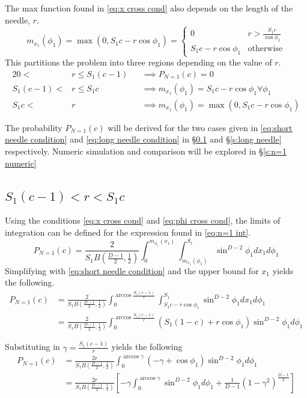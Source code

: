 \documentclass{article}
\begin{document}
The max function found in \ref{eq:x cross cond} also depends on the length of the needle, $r$. 
\begin{equation}
	m_{x_1}(\phi_1) = \max(0, S_1c-r\cos\phi_1) = \begin{cases}
		0 & r > \frac{S_1c}{\cos\phi_1} \\
		S_1c-r\cos\phi_1 & \text{otherwise}
	\end{cases}
\end{equation}
This partitions the problem into three regions depending on the value of $r$. 
\begin{alignat}{2}
	0 < &r \le S_1(c-1) &&\implies P_{N=1}(c) = 0 \\
	S_1(c-1) < &r \le S_1c &&\implies m_{x_1}(\phi_1) = S_1c-r\cos\phi_1 \forall \phi_1 \label{eq:short needle condition}\\
	S_1c < &r &&\implies m_{x_1}(\phi_1) = \max(0, S_1c -r\cos\phi_1) \label{eq:long needle condition}
\end{alignat}

The probability $P_{N=1}(c)$ will be derived for the two cases given in \ref{eq:short needle condition} and \ref{eq:long needle condition}
in \S \ref{s:short needle} and \S \ref{s:long needle} respectively. Numeric simulation and comparison will be explored in \S \ref{s:n=1 numeric}

\subsection{$S_1(c-1)<r<S_1c$} \label{s:short needle}
Using the conditions \ref{eq:x cross cond} and \ref{eq:phi cross cond}, the limits of integration can be defined for the expression found
in \ref{eq:n=1 int}.
\begin{equation}
	P_{N=1}(c) = \frac{2}{S_1B(\frac{D-1}{2}, \frac{1}{2})} \int_0^{m_{\phi_1}(x_1)}\int_{m_{x_1}(\phi_1)}^{S_1}\sin^{D-2}\phi_1 dx_1 d\phi_1 
\end{equation}
Simplifying with \ref{eq:short needle condition} and the upper bound for $x_1$ yields the following.
\begin{align}
	P_{N=1}(c) &= \frac{2}{S_1B(\frac{D-1}{2}, \frac{1}{2})} \int_0^{\arccos\frac{S_1(c-1)}{r}}\int_{S_1c-r\cos\phi_1}^{S_1}\sin^{D-2}\phi_1 dx_1 d\phi_1 \\
	&= \frac{2}{S_1B(\frac{D-1}{2}, \frac{1}{2})} \int_0^{\arccos\frac{S_1(c-1)}{r}} (S_1(1-c) + r\cos\phi_1)\sin^{D-2}\phi_1 d\phi_1
\end{align}

Substituting in $\gamma = \frac{S_1(c-1)}{r}$ yields the following
\begin{align}
	P_{N=1}(c) &= \frac{2r}{S_1B(\frac{D-1}{2}, \frac{1}{2})} \int_0^{\arccos\gamma} (-\gamma + \cos\phi_1)\sin^{D-2}\phi_1 d\phi_1 \\
	&= \frac{2r}{S_1B(\frac{D-1}{2}, \frac{1}{2})} \left[-\gamma\int_0^{\arccos\gamma} \sin^{D-2}\phi_1d\phi_1 + \frac{1}{D-1}(1-\gamma^2)^{\frac{D-1}{2}} \right] \label{eq:n=1 last int}
\end{align}
\end{document}
